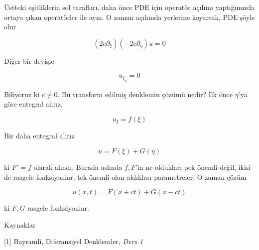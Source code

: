 \documentclass[12pt,fleqn]{article}\usepackage{../../common}
\begin{document}
Üstteki eşitliklerin sol tarafları, daha önce PDE için operatör açılımı
yaptığımızda ortaya çıkan operatörler ile aynı. O zaman açılımda yerlerine
koyarsak, PDE şöyle olur

$$ (2c\partial_\xi)(-2c\partial_\eta)u = 0 $$

Diğer bir deyişle 

$$ u_{\xi_\eta} = 0 $$

Biliyoruz ki $c \ne 0$. Bu transform edilmiş denklemin çözümü nedir? İlk
önce $\eta$'ya göre entegral alırız, 

$$ u_\xi = f(\xi) $$

Bir daha entegral alırız

$$ u = F(\xi) + G(\eta) $$

ki $F' = f$ olarak alındı. Burada aslında $f,F$'in ne oldukları pek önemli
değil, ikisi de rasgele fonksiyonlar, tek önemli olan aldıkları
parametreler. O zaman çözüm 

$$ u(x,t) = F(x+ct) + G(x-ct) $$

ki $F,G$ rasgele fonksiyonlar. 

Kaynaklar

[1] Bayramli, Diferansiyel  Denklemler, {\em Ders 1}
\end{document}
